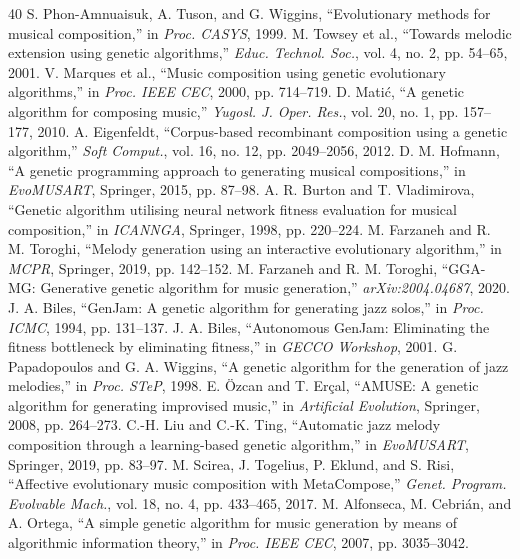 \documentclass[12pt,a4paper]{report}
\begin{document}
\begin{thebibliography}{40}
 S. Phon-Amnuaisuk, A. Tuson, and G. Wiggins, ``Evolutionary methods for musical composition,'' in \emph{Proc. CASYS}, 1999.
 M. Towsey et al., ``Towards melodic extension using genetic algorithms,'' \emph{Educ. Technol. Soc.}, vol. 4, no. 2, pp. 54--65, 2001.
 V. Marques et al., ``Music composition using genetic evolutionary algorithms,'' in \emph{Proc. IEEE CEC}, 2000, pp. 714--719.
 D. Mati{\'c}, ``A genetic algorithm for composing music,'' \emph{Yugosl. J. Oper. Res.}, vol. 20, no. 1, pp. 157--177, 2010.
 A. Eigenfeldt, ``Corpus-based recombinant composition using a genetic algorithm,'' \emph{Soft Comput.}, vol. 16, no. 12, pp. 2049--2056, 2012.
 D. M. Hofmann, ``A genetic programming approach to generating musical compositions,'' in \emph{EvoMUSART}, Springer, 2015, pp. 87--98.
 A. R. Burton and T. Vladimirova, ``Genetic algorithm utilising neural network fitness evaluation for musical composition,'' in \emph{ICANNGA}, Springer, 1998, pp. 220--224.
 M. Farzaneh and R. M. Toroghi, ``Melody generation using an interactive evolutionary algorithm,'' in \emph{MCPR}, Springer, 2019, pp. 142--152.
 M. Farzaneh and R. M. Toroghi, ``GGA-MG: Generative genetic algorithm for music generation,'' \emph{arXiv:2004.04687}, 2020.
 J. A. Biles, ``GenJam: A genetic algorithm for generating jazz solos,'' in \emph{Proc. ICMC}, 1994, pp. 131--137.
 J. A. Biles, ``Autonomous GenJam: Eliminating the fitness bottleneck by eliminating fitness,'' in \emph{GECCO Workshop}, 2001.
 G. Papadopoulos and G. A. Wiggins, ``A genetic algorithm for the generation of jazz melodies,'' in \emph{Proc. STeP}, 1998.
 E. {\"O}zcan and T. Er{\c{c}}al, ``AMUSE: A genetic algorithm for generating improvised music,'' in \emph{Artificial Evolution}, Springer, 2008, pp. 264--273.
 C.-H. Liu and C.-K. Ting, ``Automatic jazz melody composition through a learning-based genetic algorithm,'' in \emph{EvoMUSART}, Springer, 2019, pp. 83--97.
 M. Scirea, J. Togelius, P. Eklund, and S. Risi, ``Affective evolutionary music composition with MetaCompose,'' \emph{Genet. Program. Evolvable Mach.}, vol. 18, no. 4, pp. 433--465, 2017.
 M. Alfonseca, M. Cebri{\'a}n, and A. Ortega, ``A simple genetic algorithm for music generation by means of algorithmic information theory,'' in \emph{Proc. IEEE CEC}, 2007, pp. 3035--3042.

\end{thebibliography}
\end{document}
